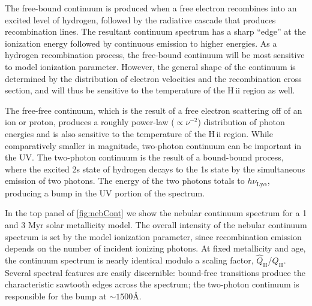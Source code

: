 \documentclass[linenumbers, trackchanges, tighten]{aastex61}%
\newcommand{\Fig}[1]{\autoref{fig:#1}}
\newcommand{\hii}{H\,{\sc ii}\xspace}
\newcommand{\ang}{\ensuremath{\mbox{\AA}}}
\newcommand{\QH}{\ensuremath{Q_{\mathrm{H}}}}
\newcommand{\QHat}{\ensuremath{\hat{Q}_{\mathrm{H}}}}
\begin{document}
The free-bound continuum is produced when a free electron recombines into an excited level of hydrogen, followed by the radiative cascade that produces recombination lines. The resultant continuum spectrum has a sharp ``edge'' at the ionization energy followed by continuous emission to higher energies. As a hydrogen recombination process, the free-bound continuum will be most sensitive to model ionization parameter. However, the general shape of the continuum is determined by the distribution of electron velocities and the recombination cross section, and will thus be sensitive to the temperature of the \hii region as well.

The free-free continuum, which is the result of a free electron scattering off of an ion or proton, produces a roughly power-law ($\propto \nu^{-2}$) distribution of photon energies and is also sensitive to the temperature of the \hii region. While comparatively smaller in magnitude, two-photon continuum can be important in the UV. The two-photon continuum is the result of a bound-bound process, where the excited 2s state of hydrogen decays to the 1s state by the simultaneous emission of two photons. The energy of the two photons totals to $h\nu_{\mathrm{Ly}\alpha}$, producing a bump in the UV portion of the spectrum.

In the top panel of \Fig{nebCont} we show the nebular continuum spectrum for  a 1 and 3 Myr solar metallicity model. The overall intensity of the nebular continuum spectrum is set by the model ionization parameter, since recombination emission depends on the number of incident ionizing photons. At fixed metallicity and age, the continuum spectrum is nearly identical modulo a scaling factor, \QHat{}/\QH{}. Several spectral features are easily discernible: bound-free transitions produce the characteristic sawtooth edges across the spectrum; the two-photon continuum is responsible for the bump at ${\sim}1500 \ang$.
\end{document}
